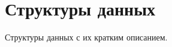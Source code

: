 \section{Структуры данных}
Структуры данных с их кратким описанием.\begin{DoxyCompactList}
\item{}
\item{}
\item{}
\end{DoxyCompactList}
